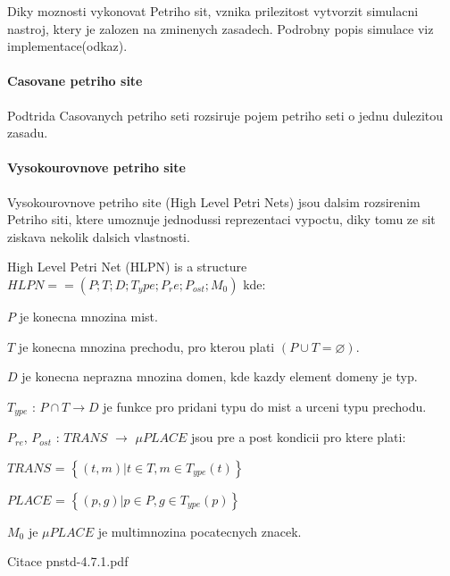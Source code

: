 Diky moznosti vykonovat Petriho sit, vznika prilezitost vytvorzit simulacni nastroj, ktery je zalozen na zminenych zasadech. Podrobny popis simulace viz implementace(odkaz).

\paragraph{Casovane petriho site}
Podtrida Casovanych petriho seti rozsiruje pojem petriho seti o jednu dulezitou zasadu. 
\paragraph{Vysokourovnove petriho site}
Vysokourovnove petriho site (High Level Petri Nets) jsou dalsim rozsirenim Petriho siti, ktere umoznuje jednodussi reprezentaci vypoctu, diky tomu ze sit ziskava nekolik dalsich vlastnosti. 

High Level Petri Net (HLPN) is a structure $HLPN = = \left( P; T; D; T_ype; P_re; P_{ost}; M_0\right) $ kde: 

\begin{itemize}
  \item $P$ je konecna mnozina mist. \\
  \item $T$ je konecna mnozina prechodu, pro kterou plati $\left(P \cup T = \varnothing\right)$. \\
  \item $D$ je konecna neprazna mnozina domen, kde kazdy element domeny je typ. \\ %
  \item $T_{ype}$ : $P \cap T \rightarrow D$ je funkce pro pridani typu do mist a urceni typu prechodu.
  \item $P_{re}$, $P_{ost}$ : $TRANS$ $\rightarrow$ $\mu PLACE$ jsou pre a post kondicii pro ktere plati: \\
  \begin{center}
    \item $TRANS$ = $\left\{\left(t, m\right) | t \in T, m \in T_{ype} \left( t \right)\right\}$ \\
    \item $PLACE$ = $\left\{\left(p, g\right) | p \in P, g \in T_{ype} \left( p \right)\right\}$ \\
  \end{center}

  \item $M_0$ je $\mu PLACE$ je multimnozina pocatecnych znacek.
\end{itemize}
Citace pnstd-4.7.1.pdf
